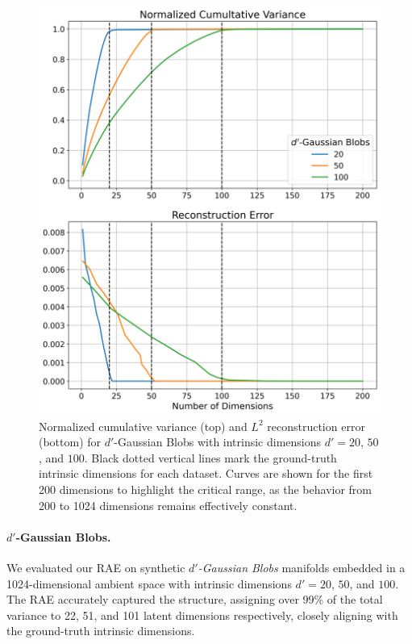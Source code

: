 \begin{figure}[!htbp]
    \centering
    \includegraphics[width=\textwidth, height=0.6\textheight, keepaspectratio]{Chapter5/results/blobs/combined_variances_reconstruction_errors_plot.png}
    \caption{Normalized cumulative variance (top) and \(L^2\) reconstruction error (bottom) for \(d'\)-Gaussian Blobs with intrinsic dimensions \(d' = 20\), \(50\), and \(100\). Black dotted vertical lines mark the ground-truth intrinsic dimensions for each dataset. Curves are shown for the first 200 dimensions to highlight the critical range, as the behavior from 200 to 1024 dimensions remains effectively constant.}
    \label{fig:variance_reconstruction}
\end{figure}


\paragraph{\(d'\)-Gaussian Blobs.}
We evaluated our RAE on synthetic \emph{\(d'\)-Gaussian Blobs} manifolds embedded in a 1024-dimensional ambient space with intrinsic dimensions \(d' = 20\), \(50\), and \(100\). The RAE accurately captured the structure, assigning over 99\% of the total variance to 22, 51, and 101 latent dimensions respectively, closely aligning with the ground-truth intrinsic dimensions.

